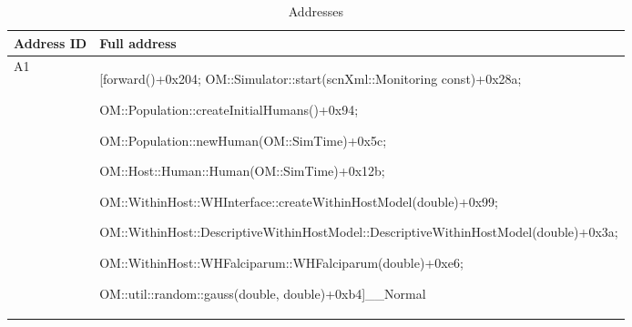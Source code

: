 \documentclass{article}
\begin{document}
  \begin{table}[h!]
  \footnotesize
  \setlength{\tabcolsep}{1mm}
  \caption{Addresses }
  \label{table:addresses}
  \def\arraystretch{1.25}
  \begin{tabularx}{\textwidth}{@{}lX@{}} 
    \toprule
    Address ID & Full address \\
    \midrule
  A1 & [forward()+0x204; OM::Simulator::start(scnXml::Monitoring const)+0x28a;

  OM::Population::createInitialHumans()+0x94; 

  OM::Population::newHuman(OM::SimTime)+0x5c;

  OM::Host::Human::Human(OM::SimTime)+0x12b;

  OM::WithinHost::WHInterface::createWithinHostModel(double)+0x99;

  OM::WithinHost::DescriptiveWithinHostModel::DescriptiveWithinHostModel(double)+0x3a;

  OM::WithinHost::WHFalciparum::WHFalciparum(double)+0xe6; 

  OM::util::random::gauss(double, double)+0xb4]\_\_Normal\\











\end{tabularx}
\end{table}
\end{document}
